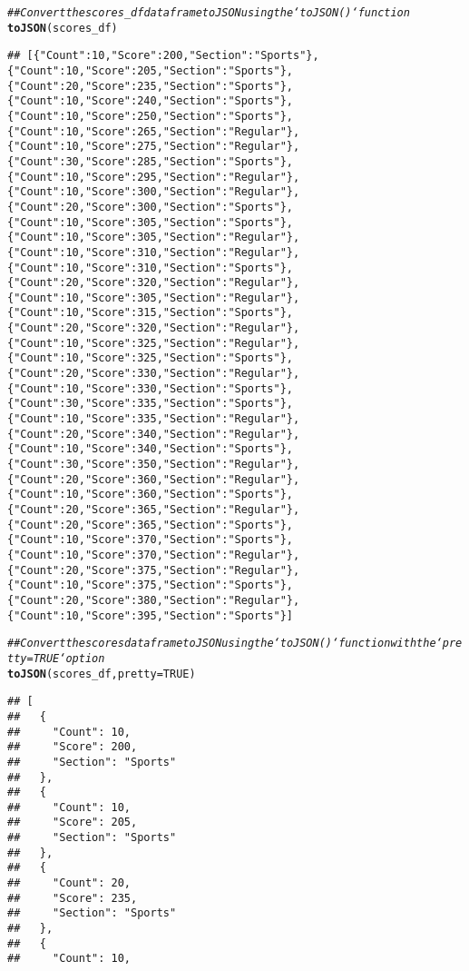 \documentclass{article}\usepackage[]{graphicx}\usepackage[]{xcolor}
\makeatletter
\newcommand{\hlnum}[1]{\textcolor[rgb]{0.686,0.059,0.569}{#1}}%
\newcommand{\hlcom}[1]{\textcolor[rgb]{0.678,0.584,0.686}{\textit{#1}}}%
\newcommand{\hlstd}[1]{\textcolor[rgb]{0.345,0.345,0.345}{#1}}%
\newcommand{\hlkwc}[1]{\textcolor[rgb]{0.333,0.667,0.333}{#1}}%
\newcommand{\hlkwd}[1]{\textcolor[rgb]{0.737,0.353,0.396}{\textbf{#1}}}%
\newenvironment{kframe}{%
 \def\at@end@of@kframe{}%
 \ifinner\ifhmode%
  \def\at@end@of@kframe{\end{minipage}}%
  \begin{minipage}{\columnwidth}%
 \fi\fi%
 \def\FrameCommand##1{\hskip\@totalleftmargin \hskip-\fboxsep
 \colorbox{shadecolor}{##1}\hskip-\fboxsep
     \hskip-\linewidth \hskip-\@totalleftmargin \hskip\columnwidth}%
 \MakeFramed {\advance\hsize-\width
   \@totalleftmargin\z@ \linewidth\hsize
   \@setminipage}}%
 {\par\unskip\endMakeFramed%
 \at@end@of@kframe}
\newenvironment{knitrout}{}{} %
\makeatother
\begin{document}
\begin{knitrout}
\begin{kframe}
\begin{alltt}
\hlcom{## Convert the scores_df dataframe to JSON using the `toJSON()` function}
\hlkwd{toJSON}\hlstd{(scores_df)}
\end{alltt}
\begin{verbatim}
## [{"Count":10,"Score":200,"Section":"Sports"},{"Count":10,"Score":205,"Section":"Sports"},{"Count":20,"Score":235,"Section":"Sports"},{"Count":10,"Score":240,"Section":"Sports"},{"Count":10,"Score":250,"Section":"Sports"},{"Count":10,"Score":265,"Section":"Regular"},{"Count":10,"Score":275,"Section":"Regular"},{"Count":30,"Score":285,"Section":"Sports"},{"Count":10,"Score":295,"Section":"Regular"},{"Count":10,"Score":300,"Section":"Regular"},{"Count":20,"Score":300,"Section":"Sports"},{"Count":10,"Score":305,"Section":"Sports"},{"Count":10,"Score":305,"Section":"Regular"},{"Count":10,"Score":310,"Section":"Regular"},{"Count":10,"Score":310,"Section":"Sports"},{"Count":20,"Score":320,"Section":"Regular"},{"Count":10,"Score":305,"Section":"Regular"},{"Count":10,"Score":315,"Section":"Sports"},{"Count":20,"Score":320,"Section":"Regular"},{"Count":10,"Score":325,"Section":"Regular"},{"Count":10,"Score":325,"Section":"Sports"},{"Count":20,"Score":330,"Section":"Regular"},{"Count":10,"Score":330,"Section":"Sports"},{"Count":30,"Score":335,"Section":"Sports"},{"Count":10,"Score":335,"Section":"Regular"},{"Count":20,"Score":340,"Section":"Regular"},{"Count":10,"Score":340,"Section":"Sports"},{"Count":30,"Score":350,"Section":"Regular"},{"Count":20,"Score":360,"Section":"Regular"},{"Count":10,"Score":360,"Section":"Sports"},{"Count":20,"Score":365,"Section":"Regular"},{"Count":20,"Score":365,"Section":"Sports"},{"Count":10,"Score":370,"Section":"Sports"},{"Count":10,"Score":370,"Section":"Regular"},{"Count":20,"Score":375,"Section":"Regular"},{"Count":10,"Score":375,"Section":"Sports"},{"Count":20,"Score":380,"Section":"Regular"},{"Count":10,"Score":395,"Section":"Sports"}]
\end{verbatim}
\begin{alltt}
\hlcom{## Convert the scores dataframe to JSON using the `toJSON()` function with the `pretty=TRUE` option}
\hlkwd{toJSON}\hlstd{(scores_df,} \hlkwc{pretty} \hlstd{=} \hlnum{TRUE}\hlstd{)}
\end{alltt}
\begin{verbatim}
## [
##   {
##     "Count": 10,
##     "Score": 200,
##     "Section": "Sports"
##   },
##   {
##     "Count": 10,
##     "Score": 205,
##     "Section": "Sports"
##   },
##   {
##     "Count": 20,
##     "Score": 235,
##     "Section": "Sports"
##   },
##   {
##     "Count": 10,

\end{verbatim}
\end{kframe}
\end{knitrout}
\end{document}
